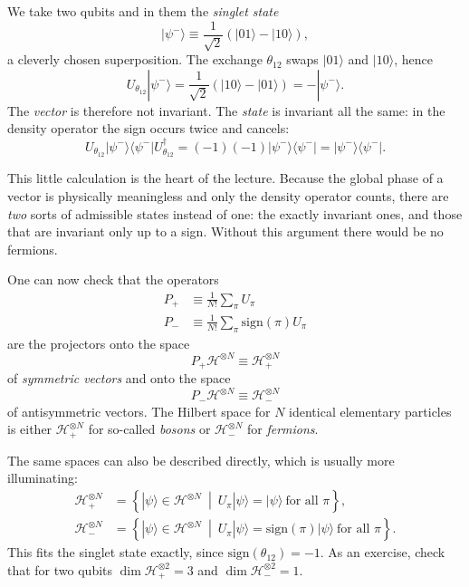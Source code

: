 \begin{example}
  We take two qubits and in them the \emph{singlet state}
  \begin{equation}
    |\psi^-\rangle \equiv \frac{1}{\sqrt{2}}\left(|01\rangle - |10\rangle\right),
  \end{equation}
  a cleverly chosen superposition. The exchange $\theta_{12}$ swaps $|01\rangle$ and $|10\rangle$, hence
  \begin{equation}
    U_{\theta_{12}}|\psi^-\rangle = \frac{1}{\sqrt{2}}\left(|10\rangle - |01\rangle\right) = -|\psi^-\rangle.
  \end{equation}
  The \emph{vector} is therefore not invariant. The \emph{state} is invariant all the same: in the density operator the sign occurs twice and cancels:
  \begin{equation}
    U_{\theta_{12}}|\psi^-\rangle\langle \psi^-|U_{\theta_{12}}^\dagger = (-1)(-1)|\psi^-\rangle\langle \psi^-| = |\psi^-\rangle\langle \psi^-|.
  \end{equation}
\end{example}

This little calculation is the heart of the lecture. Because the global phase of a vector is physically meaningless and only the density operator counts, there are \emph{two} sorts of admissible states instead of one: the exactly invariant ones, and those that are invariant only up to a sign. Without this argument there would be no fermions.

One can now check that the operators
\begin{align}
  P_{+} &\equiv \frac{1}{N!}\sum_{\pi} U_\pi \\
  P_{-} &\equiv \frac{1}{N!}\sum_{\pi} \text{sign}(\pi)U_\pi 
\end{align}
are the projectors onto the
space 
\begin{equation}
  P_{+}\mathcal{H}^{\otimes N} \equiv \mathcal{H}^{\otimes N}_{+}
\end{equation}
of \emph{symmetric vectors} and onto the space
\begin{equation}
  P_{-}\mathcal{H}^{\otimes N} \equiv \mathcal{H}^{\otimes N}_{-}
\end{equation}
of antisymmetric vectors. The Hilbert space for $N$ identical elementary particles is either $\mathcal{H}^{\otimes N}_{+}$ for so-called \emph{bosons} or $\mathcal{H}^{\otimes N}_{-}$ for \emph{fermions}.

The same spaces can also be described directly, which is usually more illuminating:
\begin{align}
  \mathcal{H}^{\otimes N}_{+} &= \left\{|\psi\rangle \in \mathcal{H}^{\otimes N}\ \middle|\ U_\pi|\psi\rangle = |\psi\rangle\ \text{for all $\pi$}\right\},\\
  \mathcal{H}^{\otimes N}_{-} &= \left\{|\psi\rangle \in \mathcal{H}^{\otimes N}\ \middle|\ U_\pi|\psi\rangle = \text{sign}(\pi)|\psi\rangle\ \text{for all $\pi$}\right\}.
\end{align}
This fits the singlet state exactly, since $\text{sign}(\theta_{12}) = -1$. As an exercise, check that for two qubits $\dim \mathcal{H}^{\otimes 2}_{+} = 3$ and $\dim \mathcal{H}^{\otimes 2}_{-} = 1$.

